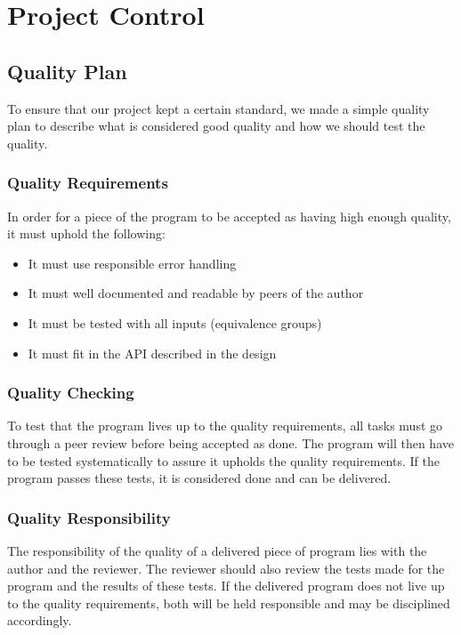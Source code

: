 \section{Project Control}
\label{sec:EmpiriControl}
\subsection{Quality Plan}
\label{sec:EmpiriQualityControl}
To ensure that our project kept a certain standard, we made a simple quality plan to describe what is considered good quality and how we should test the quality.

\subsubsection{Quality Requirements}
In order for a piece of the program to be accepted as having high enough quality, it must uphold the following:
\begin{itemize}
\item It must use responsible error handling
\item It must well documented and readable by peers of the author
\item It must be tested with all inputs (equivalence groups)
\item It must fit in the API described in the design
\end{itemize}


\subsubsection{Quality Checking}
To test that the program lives up to the quality requirements, all tasks must go through a peer review before being accepted as done. The program will then have to be tested systematically to assure it upholds the quality requirements. If the program passes these tests, it is considered done and can be delivered.

\subsubsection{Quality Responsibility}
The responsibility of the quality of a delivered piece of program lies with the author and the reviewer. The reviewer should also review the tests made for the program and the results of these tests. If the delivered program does not live up to the quality requirements, both will be held responsible and may be disciplined accordingly.

